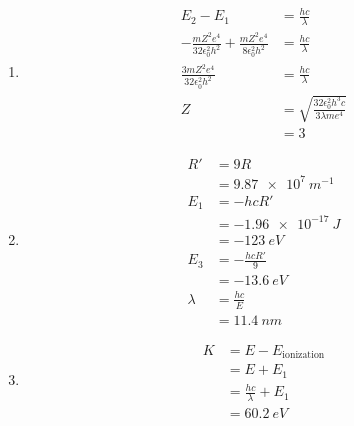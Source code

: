 \documentclass{article}
\begin{document}
\setcounter{subsubsection}{82}
\subsubsection{}

\begin{enumerate}
  \item

        \begin{align*}
          E_2 - E_1                                                                     & = \frac{h c}{\lambda}                                   \\
          -\frac{m Z^2 e^4}{32 \epsilon_0^2 h^2} + \frac{m Z^2 e^4}{8 \epsilon_0^2 h^2} & = \frac{h c}{\lambda}                                   \\
          \frac{3 m Z^2 e^4}{32 \epsilon_0^2 h^2}                                       & = \frac{h c}{\lambda}                                   \\
          Z                                                                             & =  \sqrt{\frac{32 \epsilon_0^2 h^3 c}{3 \lambda m e^4}} \\
                                                                                        & = 3
        \end{align*}

  \item

        \begin{align*}
          R'      & = 9 R                  \\
                  & = \qty{9.87e7}{m^{-1}} \\
          E_1     & = -h c R'              \\
                  & = \qty{-1.96e-17}{J}   \\
                  & = \qty{-123}{eV}       \\
          E_3     & = -\frac{h c R'}{9}    \\
                  & = \qty{-13.6}{eV}      \\
          \lambda & = \frac{h c}{E}        \\
                  & = \qty{11.4}{nm}
        \end{align*}

  \item

        \begin{align*}
          K & = E - E_\text{ionization}   \\
            & = E + E_1                   \\
            & = \frac{h c}{\lambda} + E_1 \\
            & = \qty{60.2}{eV}
        \end{align*}
\end{enumerate}
\end{document}
